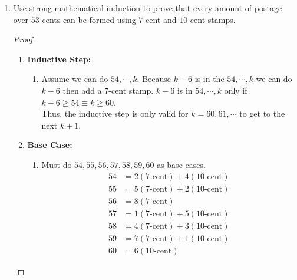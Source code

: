 \documentclass{article}
\begin{document}
\begin{enumerate}
\begin{proof}
\begin{enumerate}
\begin{enumerate}
\begin{align*}
              &\leq \left[1+n\right] + \frac{1}{2^n +1}+\cdots +\frac{1}{2^{n+1}}\\
              &\leq \left[1+n\right] + 2^n\cdot \frac{1}{2^{n+1}} \\
              &\leq 1 + n + \frac{1}{2} \\
              &\leq \frac{3}{2} + n \leq 2 + n
            \end{align*}
        \end{enumerate}
      \item[] Thus for all $n\geq 1$, $$H_{2^n}\leq 1+n$$
    \end{enumerate}
  \end{proof}
  \pagebreak

\item
  Use strong mathematical induction to prove that every amount of
  postage over $53$ cents can be formed using $7$-cent and $10$-cent stamps.
  \begin{proof}
    $ $
    \begin{enumerate}
      \item[] \textbf{Inductive Step:}
        \begin{enumerate}
          \item[]
          Assume we can do $54,\cdots,k$. Because $k-6$ is in the $54,\cdots,k$ we can do $k-6$ then add a $7$-cent stamp.
          $k-6$ is in $54,\cdots,k$ only if $k-6\geq 54 \equiv k\geq60$.\\
          Thus, the inductive step is only valid for $k=60,61,\cdots$ to get to the next $k+1$.
        \end{enumerate} 
      \item[] \textbf{Base Case:}
        \begin{enumerate}
          \item[] Must do $54,55,56,57,58,59,60$ as base cases.
          \begin{align*}
            54 &= 2(7\text{-cent}) + 4(10\text{-cent})\\
            55 &= 5(7\text{-cent}) + 2(10\text{-cent})\\
            56 &= 8(7\text{-cent})\\
            57 &= 1(7\text{-cent}) + 5(10\text{-cent})\\
            58 &= 4(7\text{-cent}) + 3(10\text{-cent})\\
            59 &= 7(7\text{-cent}) + 1(10\text{-cent})\\
            60 &= 6(10\text{-cent})
          \end{align*} 
        \end{enumerate}
    \end{enumerate}
  \end{proof}

\end{enumerate}
\end{document}
